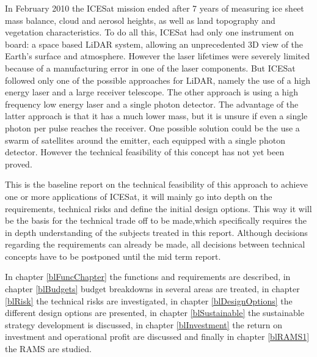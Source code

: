 In February 2010 the ICESat mission ended after 7 years of measuring ice sheet mass balance, cloud and aerosol heights, as well as land topography and vegetation characteristics.
To do all this, ICESat had only one instrument on board: a space based \ac{LiDAR} system, allowing an unprecedented 3D view of the Earth's surface and atmosphere.
However the laser lifetimes were severely limited because of a manufacturing error in one of the laser components.
But ICESat followed only one of the possible approaches for \ac{LiDAR}, namely the use of a high energy laser and a large receiver telescope. The other approach is using a high frequency low energy laser and a single photon detector. The advantage of the latter approach is that it has a much lower mass, but it is unsure if even a single photon per pulse reaches the receiver. One possible solution could be the use a swarm of satellites around the emitter, each equipped with a single photon detector. However the technical feasibility of this concept has not yet been proved.

This is the baseline report on the technical feasibility of this approach to achieve one or more applications of ICESat, it will mainly go into depth on the requirements, technical risks and define the initial design options. This way it will be the basis for the technical trade off to be made,which specifically requires the in depth understanding of the subjects treated in this report. Although decisions regarding the requirements can already be made, all decisions between technical concepts have to be postponed until the mid term report.

In chapter \ref{blFuncChapter} the functions and requirements are described, in chapter \ref{blBudgets} budget breakdowns in several areas are treated, in chapter \ref{blRisk} the technical risks are investigated, in chapter \ref{blDesignOptions} the different design options are presented, in chapter \ref{blSustainable} the sustainable strategy development is discussed, in chapter \ref{blInvestment} the return on investment and operational profit are discussed and finally in chapter \ref{blRAMS1} the \ac{RAMS} are studied.